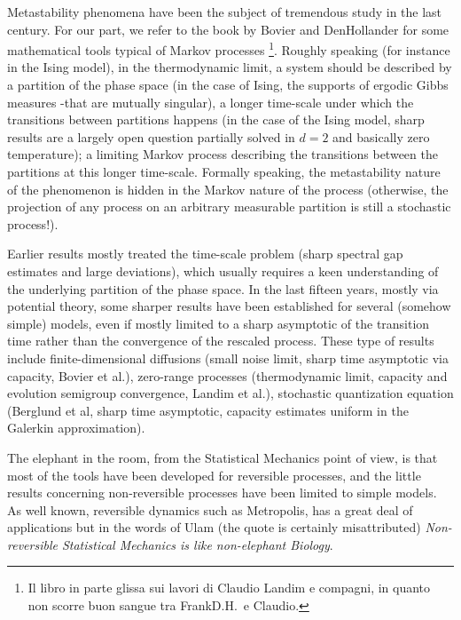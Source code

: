 \documentclass[reqno]{amsart}
\newcounter{as}[section]
\newcommand{\<}{\langle}
\renewcommand{\>}{\rangle}
\begin{document}
Metastability phenomena have been the subject of tremendous study in the last century. For our part, we refer to the book by Bovier and DenHollander for some mathematical tools typical of Markov processes
\footnote{
Il libro in parte glissa sui lavori di Claudio Landim e compagni, in quanto non scorre buon sangue tra FrankD.H.\ e Claudio. 
}.
Roughly speaking (for instance in the Ising model), in the thermodynamic limit, a system should be described by a partition of the phase space (in the case of Ising, the supports of ergodic Gibbs measures -that are mutually singular), a longer time-scale under which the transitions between partitions happens (in the case of the Ising model, sharp results are a largely open question partially solved in $d=2$ and basically zero temperature); a limiting Markov process describing the transitions between the partitions at this longer time-scale. Formally speaking, the metastability nature of the phenomenon is hidden in the Markov nature of the process (otherwise, the projection of any process on an arbitrary measurable partition is still a stochastic process!).

Earlier results mostly treated the time-scale problem (sharp spectral gap estimates and large deviations), which usually requires a keen understanding of the underlying partition of the phase space. In the last fifteen years, mostly via potential theory, some sharper results have been established for several (somehow simple) models, even if mostly limited to a sharp asymptotic of the transition time rather than the convergence of the rescaled process. These type of results include finite-dimensional diffusions (small noise limit, sharp time asymptotic via capacity, Bovier et al.), zero-range processes (thermodynamic limit, capacity and evolution semigroup convergence, Landim et al.), stochastic quantization equation (Berglund et al, sharp time asymptotic, capacity estimates uniform in the Galerkin approximation).

The elephant in the room, from the Statistical Mechanics point of view, is that most of the tools have been developed for reversible processes, and the little results concerning non-reversible processes have been limited to simple models. As well known, reversible dynamics such as Metropolis, has a great deal of applications but in the words of Ulam (the quote is certainly misattributed) \emph{Non-reversible Statistical Mechanics is like non-elephant Biology}.
\end{document}

